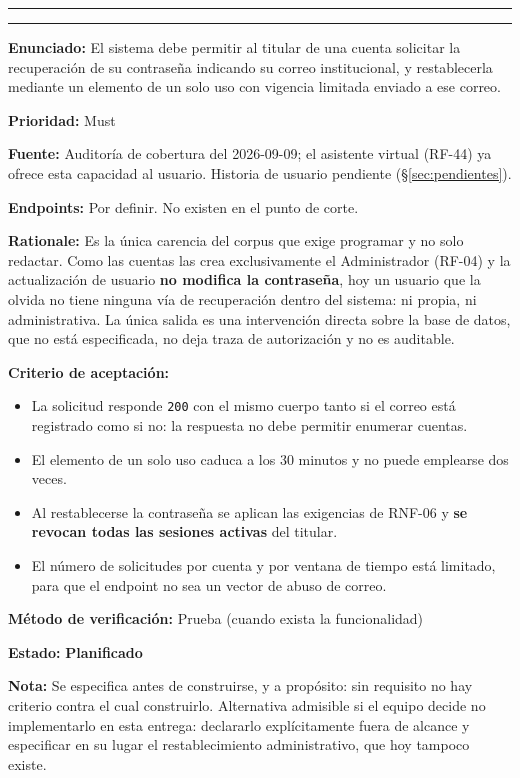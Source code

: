\documentclass[11pt,a4paper]{article}
\newcommand{\estadoP}{\textcolor{grisln}{\textbf{Planificado}}}
\newcommand{\REQ}[2]{%
  \par\vspace{3mm}%
  \noindent\rule{\linewidth}{0.7pt}\par\nobreak\vspace{0.6mm}%
  \noindent{\normalsize\textbf{#1\quad #2}}\par\nobreak\vspace{0.6mm}%
  \noindent\rule{\linewidth}{0.3pt}\par\nobreak\vspace{1mm}}
\newcommand{\campo}[2]{\noindent\textbf{#1:} #2\par\vspace{0.4mm}}
\begin{document}
\REQ{RF-05}{Recuperación de la contraseña olvidada}
\campo{Enunciado}{El sistema debe permitir al titular de una cuenta solicitar la recuperación de
su contraseña indicando su correo institucional, y restablecerla mediante un elemento de un solo
uso con vigencia limitada enviado a ese correo.}
\campo{Prioridad}{Must}
\campo{Fuente}{Auditoría de cobertura del 2026-09-09; el asistente virtual (RF-44) ya ofrece
esta capacidad al usuario. Historia de usuario pendiente (\S\ref{sec:pendientes}).}
\campo{Endpoints}{Por definir. No existen en el punto de corte.}
\campo{Rationale}{Es la única carencia del corpus que exige programar y no solo redactar. Como
las cuentas las crea exclusivamente el Administrador (RF-04) y la actualización de usuario
\textbf{no modifica la contraseña}, hoy un usuario que la olvida no tiene ninguna vía de
recuperación dentro del sistema: ni propia, ni administrativa. La única salida es una
intervención directa sobre la base de datos, que no está especificada, no deja traza de
autorización y no es auditable.}
\campo{Criterio de aceptación}{}
\begin{itemize}
    \item La solicitud responde \texttt{200} con el mismo cuerpo tanto si el correo está
          registrado como si no: la respuesta no debe permitir enumerar cuentas.
    \item El elemento de un solo uso caduca a los 30 minutos y no puede emplearse dos veces.
    \item Al restablecerse la contraseña se aplican las exigencias de RNF-06 y \textbf{se
          revocan todas las sesiones activas} del titular.
    \item El número de solicitudes por cuenta y por ventana de tiempo está limitado, para que el
          endpoint no sea un vector de abuso de correo.
\end{itemize}
\campo{Método de verificación}{Prueba (cuando exista la funcionalidad)}
\campo{Estado}{\estadoP}
\campo{Nota}{Se especifica antes de construirse, y a propósito: sin requisito no hay criterio
contra el cual construirlo. Alternativa admisible si el equipo decide no implementarlo en esta
entrega: declararlo explícitamente fuera de alcance y especificar en su lugar el restablecimiento
administrativo, que hoy tampoco existe.}
\end{document}
